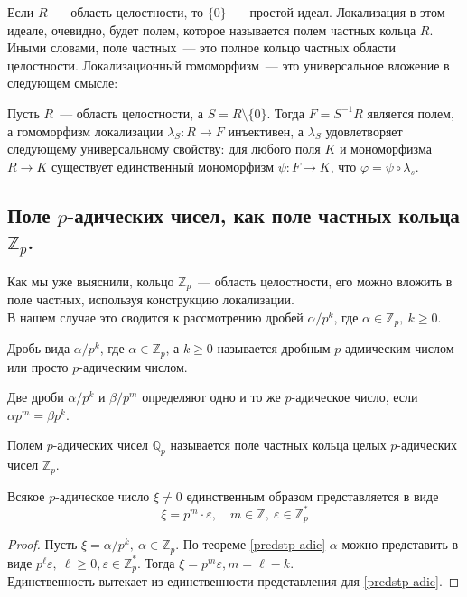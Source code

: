 \documentclass[11pt]{report}
\begin{document}
    Если $R$~--- область целостности, то $\{ 0 \}$~--- простой идеал. Локализация в этом идеале, очевидно,
    будет полем, которое называется полем частных кольца $R$.\\

    Иными словами, поле частных~--- это полное кольцо частных области целостности. Локализационный гомоморфизм~--- это
    универсальное вложение в следующем смысле:

    \begin{lemma}
        Пусть $R$~--- область целостности, а $S = R\setminus \{ 0 \}$. Тогда $F = S^{-1}R$ является полем, а гомоморфизм
        локализации $\lambda_{S}\colon R \to F$ инъективен, а $\lambda_{S}$ удовлетворяет следующему универсальному свойству:
        для любого поля $K$ и мономорфизма $R \to K$ существует единственный мономорфизм $\psi\colon F \to K$, что $\varphi = \psi \circ \lambda_s$.
    \end{lemma}

    \subsection{Поле $p$-адических чисел, как поле частных кольца $\mathbb{Z}_p$.}

    Как мы уже выяснили, кольцо $\mathbb{Z}_p$~--- область целостности, его можно вложить в поле частных, используя
    конструкцию локализации.\\
    В нашем случае это сводится к рассмотрению дробей $\alpha / p^k$, где $\alpha \in \mathbb{Z}_p, \ k \ge 0$.
    \begin{definition}
        Дробь вида $\alpha / p^k$, где $\alpha \in \mathbb{Z}_p$, а $k \ge 0$ называется дробным $p$-адмическим числом
        или просто $p$-адическим числом.
    \end{definition}
    \begin{remark}
         Две дроби $\alpha / p^k$ и $\beta / p^m$ определяют одно и то же $p$-адическое число, если $\alpha p^m = \beta p^k$.
    \end{remark}

    \begin{definition}
        Полем  $p$-адических чисел $\mathbb{Q}_p$ называется поле частных кольца целых $p$-адических чисел $\mathbb{Z}_p$.
    \end{definition}

    \begin{theorem}
        Всякое $p$-адическое число $\xi \neq 0$ единственным образом представляется в виде
        \[ \xi = p^m \cdot \varepsilon, \quad m \in \mathbb{Z}, \ \varepsilon \in \mathbb{Z}_p^{*} \]
    \end{theorem}
    \begin{proof}
        Пусть $\xi = \alpha / p^k, \ \alpha \in \mathbb{Z}_p$. По теореме \ref{predstp-adic}  $\alpha$ можно представить в виде
        $p^{\ell} \varepsilon, \ \ell \ge 0, \varepsilon \in \mathbb{Z}_p^{*}$. Тогда $\xi = p^m \varepsilon, m = \ell - k$.\\
        Единственность вытекает из единственности представления для \ref{predstp-adic}.
    \end{proof}
\end{document}
